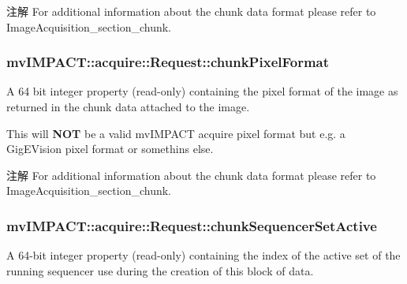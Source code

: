 \begin{DoxyNote}{注解}
For additional information about the chunk data format please refer to Image\+Acquisition\+\_\+section\+\_\+chunk. 
\end{DoxyNote}
\hypertarget{classmv_i_m_p_a_c_t_1_1acquire_1_1_request_aff2e190d6cc5eed39686684febf2b633}{
\subsubsection[{chunk\+Pixel\+Format}]{ mv\+I\+M\+P\+A\+C\+T\+::acquire\+::\+Request\+::chunk\+Pixel\+Format}}\label{classmv_i_m_p_a_c_t_1_1acquire_1_1_request_aff2e190d6cc5eed39686684febf2b633}


A 64 bit integer property {\bfseries }(read-\/only) containing the pixel format of the image as returned in the chunk data attached to the image. 

This will {\bfseries N\+O\+T} be a valid mv\+I\+M\+P\+A\+C\+T acquire pixel format but e.\+g. a Gig\+E\+Vision pixel format or somethins else. \begin{DoxyNote}{注解}
For additional information about the chunk data format please refer to Image\+Acquisition\+\_\+section\+\_\+chunk. 
\end{DoxyNote}
\hypertarget{classmv_i_m_p_a_c_t_1_1acquire_1_1_request_aa66d08fd7e75d93657c403d6c697e656}{
\subsubsection[{chunk\+Sequencer\+Set\+Active}]{ mv\+I\+M\+P\+A\+C\+T\+::acquire\+::\+Request\+::chunk\+Sequencer\+Set\+Active}}\label{classmv_i_m_p_a_c_t_1_1acquire_1_1_request_aa66d08fd7e75d93657c403d6c697e656}


A 64-\/bit integer property {\bfseries }(read-\/only) containing the index of the active set of the running sequencer use during the creation of this block of data. 

